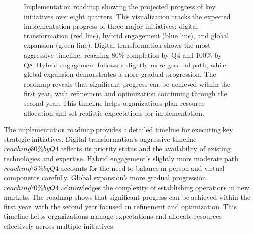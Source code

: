 \documentclass[conference]{IEEEtran}
\begin{document}
\begin{figure}[t]
\centering
{}
\caption{Implementation roadmap showing the projected progress of key initiatives over eight quarters. 
This visualization tracks the expected implementation progress of three major initiatives: 
digital transformation (red line), hybrid engagement (blue line), and global expansion (green line). 
Digital transformation shows the most aggressive timeline, reaching 80\% completion by Q4 and 100\% by Q8. 
Hybrid engagement follows a slightly more gradual path, while global expansion demonstrates a more gradual progression. 
The roadmap reveals that significant progress can be achieved within the first year, with refinement and optimization 
continuing through the second year. This timeline helps organizations plan resource allocation and set realistic 
expectations for implementation.}
\label{fig:implementation_roadmap}
\end{figure}

The implementation roadmap provides a detailed timeline for executing key strategic initiatives. Digital transformation's aggressive timeline \(reaching 80\% by Q4\) reflects its priority status and the availability of existing technologies and expertise. Hybrid engagement's slightly more moderate path \(reaching 75\% by Q4\) accounts for the need to balance in-person and virtual components carefully. Global expansion's more gradual progression \(reaching 70\% by Q4\) acknowledges the complexity of establishing operations in new markets. The roadmap shows that significant progress can be achieved within the first year, with the second year focused on refinement and optimization. This timeline helps organizations manage expectations and allocate resources effectively across multiple initiatives.
\end{document}
